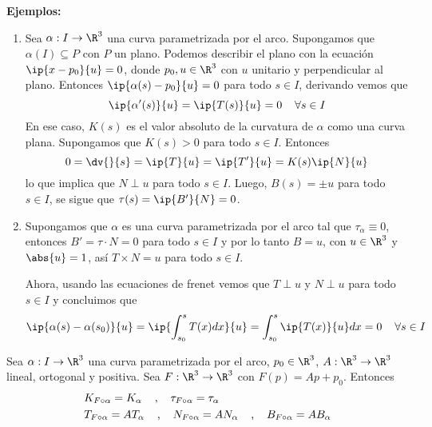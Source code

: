 \documentclass{article}
\begin{document}
\noindent\textbf{Ejemplos:}
\begin{enumerate}
    \item Sea $\alpha: I\to\R^{3}$ una curva parametrizada por el arco. Supongamos que 
    $\alpha(I)\subseteq P$ con $P$ un plano. Podemos describir el plano con la ecuación
    $\ip{x-p_{0}}{u}=0$, donde $p_{0},u\in\R^{3}$ con $u$ unitario y perpendicular al plano. 
    Entonces $\ip{\alpha(s)-p_{0}}{u}=0$ para todo $s\in I$, derivando vemos que
    \begin{equation*}
        \ip{\alpha'(s)}{u}=\ip{T(s)}{u}=0\hspace{4mm}\forall s\in I
    \end{equation*}
    En ese caso, $K(s)$ es el valor absoluto de la curvatura de $\alpha$ como una curva plana.
    Supongamos que $K(s)>0$ para todo $s\in I$. Entonces
    \begin{equation*}
        0=\dv{}{s}=\ip{T}{u}=\ip{T'}{u}=K(s)\ip{N}{u}
    \end{equation*}
    lo que implica que $N\perp u$ para todo $s\in I$. Luego, $B(s)=\pm u$ para todo $s\in I$, se
    sigue que $\tau(s)=\ip{B'}{N}=0$.

    \item Supongamos que $\alpha$ es una curva parametrizada por el arco tal que 
    $\tau_{\alpha}\equiv0$, entonces $B'=\tau\cdot N=0$ para todo $s\in I$ y por lo tanto $B=u$,
    con $u\in\R^{3}$ y $\abs{u}=1$, así $T\times N=u$ para todo $s\in I$.
    \vspace{4mm}

    \noindent Ahora, usando las ecuaciones de frenet vemos que $T\perp u$ y $N\perp u$ para todo
    $s\in I$ y concluimos que
    \begin{equation*}
        \ip{\alpha(s)-\alpha(s_{0})}{u}=\ip{\int_{s_{0}}^{s}T(x)dx}{u}=
        \int_{s_{0}}^{s}\ip{T(x)}{u}dx=0\hspace{4mm}\forall s\in I
    \end{equation*}
\end{enumerate}

\begin{prop}
    Sea $\alpha: I\to\R^{3}$ una curva parametrizada por el arco, $p_{0}\in\R^{3}$, 
    $A:\R^{3}\to\R^{3}$ lineal, ortogonal y positiva. Sea $F:\R^{3}\to\R^{3}$ con 
    $F(p)=Ap+p_{0}$. Entonces
    \begin{align*}
        & K_{F\circ\alpha}=K_{\alpha}\hspace{4mm}\text{,}\hspace{4mm}\tau_{F\circ\alpha}=
        \tau_{\alpha} \\
        & T_{F\circ\alpha}=AT_{\alpha}\hspace{4mm}\text{,}\hspace{4mm}
        N_{F\circ\alpha}=AN_{\alpha}\hspace{4mm}\text{,}\hspace{4mm}
        B_{F\circ\alpha}=AB_{\alpha}
    \end{align*}
\end{prop}
\end{document}
